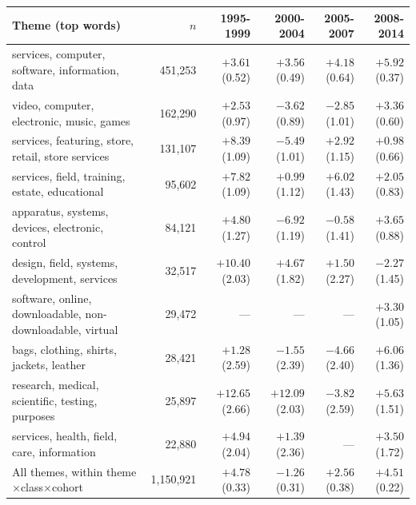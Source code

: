 \begin{tabular}{p{5.2cm}rrrrr}
\toprule
Theme (top words) & $n$ & 1995-1999 & 2000-2004 & 2005-2007 & 2008-2014 \\
\midrule
services, computer, software, information, data & 451,253 & $+3.61$ (0.52) & $+3.56$ (0.49) & $+4.18$ (0.64) & $+5.92$ (0.37) \\
video, computer, electronic, music, games & 162,290 & $+2.53$ (0.97) & $-3.62$ (0.89) & $-2.85$ (1.01) & $+3.36$ (0.60) \\
services, featuring, store, retail, store services & 131,107 & $+8.39$ (1.09) & $-5.49$ (1.01) & $+2.92$ (1.15) & $+0.98$ (0.66) \\
services, field, training, estate, educational & 95,602 & $+7.82$ (1.09) & $+0.99$ (1.12) & $+6.02$ (1.43) & $+2.05$ (0.83) \\
apparatus, systems, devices, electronic, control & 84,121 & $+4.80$ (1.27) & $-6.92$ (1.19) & $-0.58$ (1.41) & $+3.65$ (0.88) \\
design, field, systems, development, services & 32,517 & $+10.40$ (2.03) & $+4.67$ (1.82) & $+1.50$ (2.27) & $-2.27$ (1.45) \\
software, online, downloadable, non-downloadable, virtual & 29,472 & --- & --- & --- & $+3.30$ (1.05) \\
bags, clothing, shirts, jackets, leather & 28,421 & $+1.28$ (2.59) & $-1.55$ (2.39) & $-4.66$ (2.40) & $+6.06$ (1.36) \\
research, medical, scientific, testing, purposes & 25,897 & $+12.65$ (2.66) & $+12.09$ (2.03) & $-3.82$ (2.59) & $+5.63$ (1.51) \\
services, health, field, care, information & 22,880 & $+4.94$ (2.04) & $+1.39$ (2.36) & --- & $+3.50$ (1.72) \\
\midrule
All themes, within theme$\times$class$\times$cohort & 1,150,921 & $+4.78$ (0.33) & $-1.26$ (0.31) & $+2.56$ (0.38) & $+4.51$ (0.22) \\
\bottomrule
\end{tabular}
